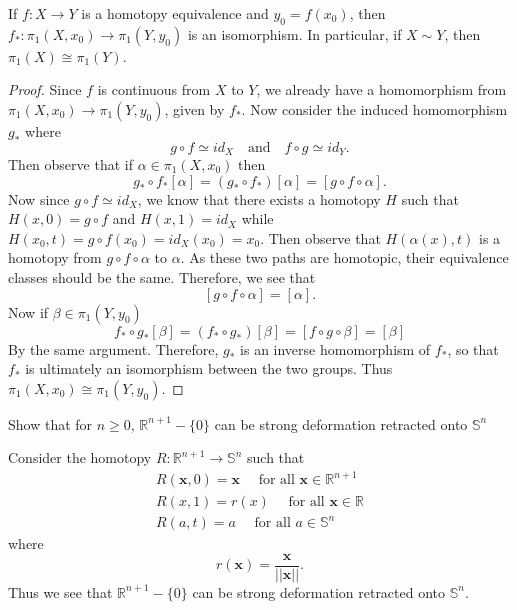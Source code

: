 \documentclass[a4paper,12pt,twoside]{hmcpset}
\begin{document}
\begin{problem}[Theorem 13.24]
    If $f: X \to Y$ is a homotopy equivalence and $y_0 = f(x_0)$, then
    $f_* : \pi_1(X, x_0) \to \pi_1(Y, y_0)$ is an isomorphism. In
    particular, if $X \sim Y$, then $\pi_1(X) \cong \pi_1(Y)$.
\end{problem}

\begin{proof}
    Since $f$ is continuous from $X$ to $Y$, we already have a
    homomorphism from $\pi_1(X, x_0) \to \pi_1(Y, y_0)$, given by
    $f_*.$ Now consider the induced homomorphism $g_*$ where 
    \[
        g \circ f \simeq id_X \quad \text{and} \quad f \circ g \simeq id_Y.
    \]
    Then observe that if $\alpha \in \pi_1(X, x_0)$ then
    \[
        g_* \circ f_*[\alpha] = (g_* \circ f_*)[\alpha] = [g \circ f \circ \alpha].
    \]
    Now since $g \circ f \simeq id_X$, we know that there exists a
    homotopy $H$ such that $H(x, 0) = g \circ f$ and $H(x, 1) = id_X$
    while $H(x_0, t) = g \circ f(x_0) = id_X(x_0) = x_0.$ Then observe
    that $H(\alpha(x), t)$ is a homotopy from $g \circ f \circ \alpha$
    to $\alpha$. As these two paths are homotopic, their equivalence
    classes should be the same. Therefore, we see that 
    \[
        [g \circ f \circ \alpha] = [\alpha].
    \]
    Now if $\beta \in \pi_1(Y, y_0)$
    \[
        f_* \circ g_*[\beta] = (f_* \circ g_*)[\beta] = [f \circ g \circ \beta]= [\beta]
    \]
    By the same argument. Therefore, $g_*$ is an inverse homomorphism of $f_*$, so that
    $f_*$ is ultimately an isomorphism between the two groups.
    Thus $\pi_1(X, x_0) \cong \pi_1(Y, y_0)$.
\end{proof}

\begin{exercise}[Exercise 13.25]
Show that for $n \ge 0$, $\mathbb{R}^{n + 1}-\{0\}$ can be strong
deformation retracted onto $\mathbb{S}^n$
\end{exercise}

\begin{solution}
Consider the homotopy $R : \mathbb{R}^{n+1} \to \mathbb{S}^n$ such
that 
\begin{gather*}
    R(\mathbf{x}, 0) = \mathbf{x} \quad \text{ for all } \mathbf{x} \in \mathbb{R}^{n+1} \\
    R(x, 1) = r(x) \quad \text{ for all } \mathbf{x} \in \mathbb{R}\\
    R(a, t) = a \quad \text{ for all } a \in \mathbb{S}^n
\end{gather*}
where 
\[
   r(\mathbf{x}) = \frac{\mathbf{x}}{||\mathbf{x}||}. 
\]
Thus we see that 
$\mathbb{R}^{n + 1}-\{0\}$ can be strong
deformation retracted onto $\mathbb{S}^n$.
\end{solution}
\end{document}
